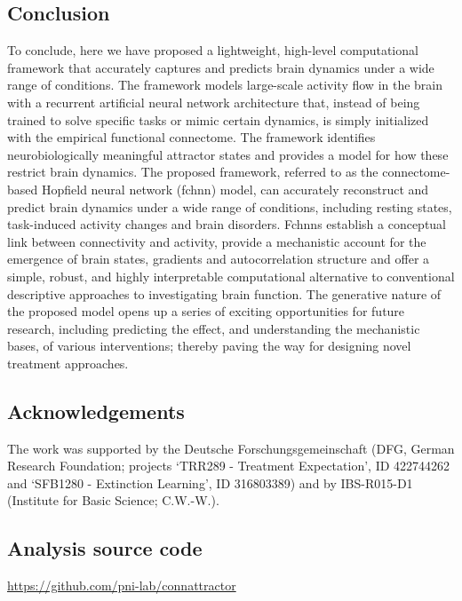 \documentclass{article}
\begin{document}
\subsection{Conclusion}

To conclude, here we have proposed a lightweight, high-level computational framework that accurately captures and predicts brain dynamics under a wide range of conditions. The framework models large-scale activity flow in the brain with a recurrent artificial neural network architecture that, instead of being trained to solve specific tasks or mimic certain dynamics, is simply initialized with the empirical functional connectome. The framework identifies neurobiologically meaningful attractor states and provides a model for how these restrict brain dynamics. The proposed framework, referred to as the connectome-based Hopfield neural network (\acrshort{fchnn}) model, can accurately reconstruct and predict brain dynamics under a wide range of conditions, including resting states, task-induced activity changes and brain disorders. Fc\acrshort{hnn}s establish a conceptual link between connectivity and activity, provide a mechanistic account for the emergence of brain states, gradients and autocorrelation structure and offer a simple, robust, and highly interpretable computational alternative to conventional descriptive approaches to investigating brain function. The generative nature of the proposed model opens up a series of exciting opportunities for future research, including predicting the effect, and understanding the mechanistic bases, of various interventions; thereby paving the way for designing novel treatment approaches.

\subsection{Acknowledgements}

The work was supported by the Deutsche Forschungsgemeinschaft (DFG, German Research Foundation; projects `TRR289 - Treatment Expectation', ID 422744262 and `SFB1280 - Extinction Learning', ID 316803389) and by IBS-R015-D1 (Institute for Basic Science; C.W.-W.).

\subsection{Analysis source code}

\href{https://github.com/pni-lab/connattractor}{https://github.com/pni-lab/connattractor}
\end{document}
